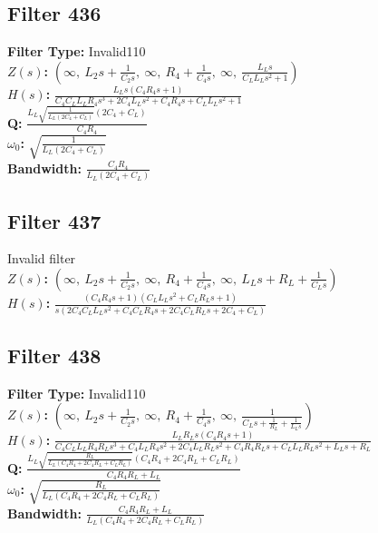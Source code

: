 \documentclass{article}
\begin{document}
\subsection*{Filter 436}
\textbf{Filter Type:} Invalid110 \\ 
\textbf{$Z(s)$:} $\left( \infty, \  L_{2} s + \frac{1}{C_{2} s}, \  \infty, \  R_{4} + \frac{1}{C_{4} s}, \  \infty, \  \frac{L_{L} s}{C_{L} L_{L} s^{2} + 1}\right)$ \\ 
\textbf{$H(s)$:} $\frac{L_{L} s \left(C_{4} R_{4} s + 1\right)}{C_{4} C_{L} L_{L} R_{4} s^{3} + 2 C_{4} L_{L} s^{2} + C_{4} R_{4} s + C_{L} L_{L} s^{2} + 1}$ \\ 
\textbf{Q:} $\frac{L_{L} \sqrt{\frac{1}{L_{L} \left(2 C_{4} + C_{L}\right)}} \left(2 C_{4} + C_{L}\right)}{C_{4} R_{4}}$ \\ 
\textbf{$\omega_0$:} $\sqrt{\frac{1}{L_{L} \left(2 C_{4} + C_{L}\right)}}$ \\ 
\textbf{Bandwidth:} $\frac{C_{4} R_{4}}{L_{L} \left(2 C_{4} + C_{L}\right)}$ \\ 
\subsection*{Filter 437}
Invalid filter \\ 
\textbf{$Z(s)$:} $\left( \infty, \  L_{2} s + \frac{1}{C_{2} s}, \  \infty, \  R_{4} + \frac{1}{C_{4} s}, \  \infty, \  L_{L} s + R_{L} + \frac{1}{C_{L} s}\right)$ \\ 
\textbf{$H(s)$:} $\frac{\left(C_{4} R_{4} s + 1\right) \left(C_{L} L_{L} s^{2} + C_{L} R_{L} s + 1\right)}{s \left(2 C_{4} C_{L} L_{L} s^{2} + C_{4} C_{L} R_{4} s + 2 C_{4} C_{L} R_{L} s + 2 C_{4} + C_{L}\right)}$ \\ 
\subsection*{Filter 438}
\textbf{Filter Type:} Invalid110 \\ 
\textbf{$Z(s)$:} $\left( \infty, \  L_{2} s + \frac{1}{C_{2} s}, \  \infty, \  R_{4} + \frac{1}{C_{4} s}, \  \infty, \  \frac{1}{C_{L} s + \frac{1}{R_{L}} + \frac{1}{L_{L} s}}\right)$ \\ 
\textbf{$H(s)$:} $\frac{L_{L} R_{L} s \left(C_{4} R_{4} s + 1\right)}{C_{4} C_{L} L_{L} R_{4} R_{L} s^{3} + C_{4} L_{L} R_{4} s^{2} + 2 C_{4} L_{L} R_{L} s^{2} + C_{4} R_{4} R_{L} s + C_{L} L_{L} R_{L} s^{2} + L_{L} s + R_{L}}$ \\ 
\textbf{Q:} $\frac{L_{L} \sqrt{\frac{R_{L}}{L_{L} \left(C_{4} R_{4} + 2 C_{4} R_{L} + C_{L} R_{L}\right)}} \left(C_{4} R_{4} + 2 C_{4} R_{L} + C_{L} R_{L}\right)}{C_{4} R_{4} R_{L} + L_{L}}$ \\ 
\textbf{$\omega_0$:} $\sqrt{\frac{R_{L}}{L_{L} \left(C_{4} R_{4} + 2 C_{4} R_{L} + C_{L} R_{L}\right)}}$ \\ 
\textbf{Bandwidth:} $\frac{C_{4} R_{4} R_{L} + L_{L}}{L_{L} \left(C_{4} R_{4} + 2 C_{4} R_{L} + C_{L} R_{L}\right)}$ \\ 
\end{document}
